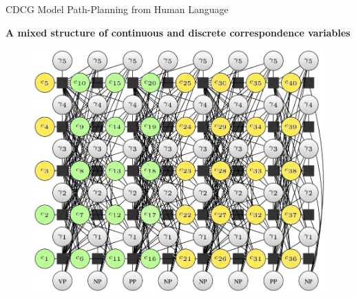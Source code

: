 \begin{frame}{CDCG}{ Model Path-Planning from Human Language }
	
{\bf A mixed structure of continuous and discrete correspondence variables}
	
\begin{figure}
	\centering
	\includegraphics[width=.6\linewidth]{figure/DCG_network_structure}
\end{figure}
	
\end{frame}

